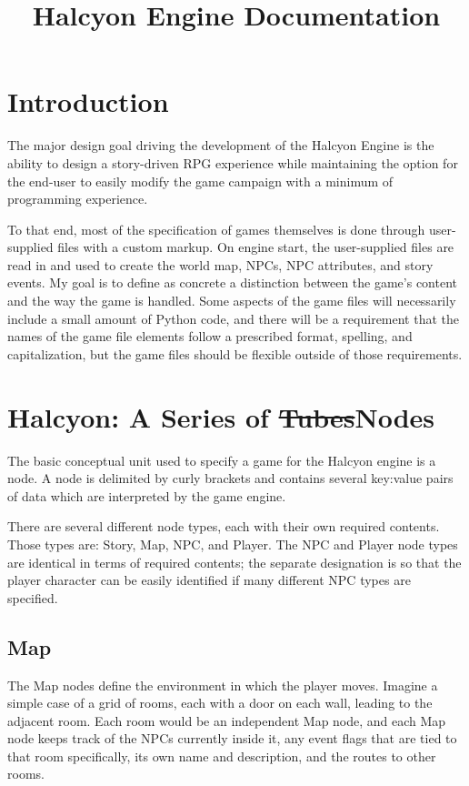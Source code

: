\documentclass[11pt]{article}
\begin{document}
\title{Halcyon Engine Documentation}
\date{}
\maketitle{}

\section{Introduction}
The major design goal driving the development of the Halcyon Engine is the ability to design a story-driven RPG experience while maintaining the option for the end-user to easily modify the game campaign with a minimum of programming experience.

To that end, most of the specification of games themselves is done through user-supplied files with a custom markup.
On engine start, the user-supplied files are read in and used to create the world map, NPCs, NPC attributes, and story events.
My goal is to define as concrete a distinction between the game's content and the way the game is handled.
Some aspects of the game files will necessarily include a small amount of Python code, and there will be a requirement that the names of the game file elements follow a prescribed format, spelling, and capitalization, but the game files should be flexible outside of those requirements.

\section{Halcyon: A Series of \sout{Tubes}Nodes}
The basic conceptual unit used to specify a game for the Halcyon engine is a node.
A node is delimited by curly brackets and contains several key:value pairs of data which are interpreted by the game engine.

There are several different node types, each with their own required contents.
Those types are: Story, Map, NPC, and Player.
The NPC and Player node types are identical in terms of required contents; the separate designation is so that the player character can be easily identified if many different NPC types are specified.

\subsection{Map}
The Map nodes define the environment in which the player moves.
Imagine a simple case of a grid of rooms, each with a door on each wall, leading to the adjacent room.
Each room would be an independent Map node, and each Map node keeps track of the NPCs currently inside it, any event flags that are tied to that room specifically, its own name and description, and the routes to other rooms.
\end{document}
